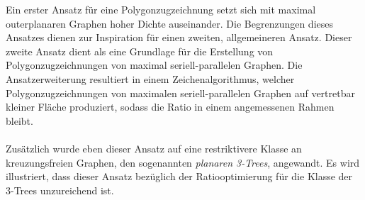 Ein erster Ansatz für eine Polygonzugzeichnung setzt sich mit maximal outerplanaren Graphen hoher Dichte auseinander. Die Begrenzungen dieses Ansatzes dienen zur Inspiration für einen zweiten, allgemeineren Ansatz. Dieser zweite Ansatz dient als eine Grundlage für die Erstellung von Polygonzugzeichnungen von maximal seriell-parallelen Graphen. Die Ansatzerweiterung resultiert in einem Zeichenalgorithmus, welcher Polygonzugzeichnungen von maximalen seriell-parallelen Graphen auf vertretbar kleiner Fläche produziert, sodass die Ratio in einem angemessenen Rahmen bleibt.\\\\
Zusätzlich wurde eben dieser Ansatz auf eine restriktivere Klasse an kreuzungsfreien Graphen, den sogenannten \emph{planaren 3-Trees}, angewandt. Es wird illustriert, dass dieser Ansatz bezüglich der Ratiooptimierung für die Klasse der 3-Trees unzureichend ist.